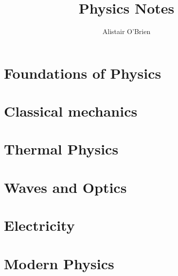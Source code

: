 \documentclass[12pt]{report}
\title{Physics Notes}
\author{Alistair O'Brien}
\theoremstyle{definition}
\begin{document}
    \maketitle
    
    \tableofcontents
    
    \chapter{Foundations of Physics}
    
    \clearpage
    
    \chapter{Classical mechanics}
    \label{chapter:mechanics}
    
    \clearpage
    
    \chapter{Thermal Physics}
    
    \clearpage
    
    \chapter{Waves and Optics}
    
    \clearpage
    
    \chapter{Electricity}
    
    \clearpage
    
    
    \chapter{Modern Physics}
    
    \clearpage
    
\end{document}
